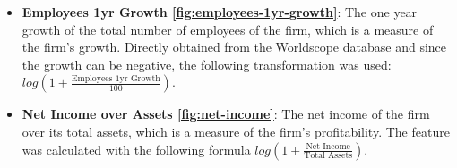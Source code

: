 \begin{itemize}
    \item \textbf{Employees 1yr Growth \ref{fig:employees-1yr-growth}}: The one year growth of the total number of employees of the firm, which is a measure of the firm's growth. Directly obtained from the Worldscope database and since the growth can be negative, the following transformation was used: $log(1 + \frac{\text{Employees 1yr Growth}}{100})$.
    \item \textbf{Net Income over Assets \ref{fig:net-income}}: The net income of the firm over its total assets, which is a measure of the firm's profitability. The feature was calculated with the following formula $log(1 + \frac{\text{Net Income}}{\text{Total Assets}})$.
\end{itemize}

\begin{figure}[H]
\centering

%
\hfill %
%
\hfill %
%


\end{figure}
